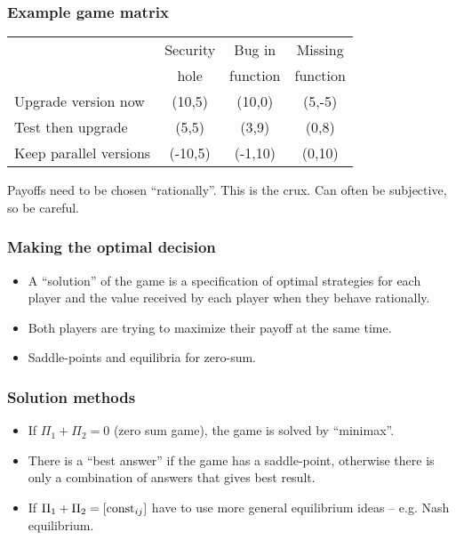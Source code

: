 \documentclass{beamer}
\begin{document}

\begin{frame}\frametitle{Example game matrix}

\begin{center}
\rm
\begin{tabular}{l|c|c|c|}
 & Security & Bug in   & Missing \\
 & hole     & function & function\\
\hline
{\small Upgrade version now} & (10,5) & (10,0) & (5,-5)\\
{\small Test then upgrade}   & (5,5)  & (3,9)  & (0,8)\\
{\small Keep parallel versions}   & (-10,5)& (-1,10) & (0,10)\\
\end{tabular}
\end{center}


Payoffs need to be chosen ``rationally''. This is the crux.
Can often be subjective, so be careful.
\end{frame}



\begin{frame}\frametitle{Making the optimal decision}

\begin{itemize}
\item A ``solution'' of the game is a specification of optimal
strategies for each player and the value received by
each player when they behave rationally.\vspace{0.2cm}

\item Both players are trying to maximize their payoff at the same
time.\vspace{0.2cm}

\item Saddle-points and equilibria for zero-sum.
\end{itemize}
\end{frame}


\begin{frame}
\frametitle{Solution methods}

\begin{itemize}
\item If $\Pi_1+\Pi_2 = 0$ (zero sum game), the game is solved by ``minimax''.\vspace{0.2cm}

\item There is a ``best answer'' if the game has a saddle-point, otherwise there
is only a combination of answers that gives best result.\vspace{0.2cm}

\item If $\Pi_1+\Pi_2 = [{\rm const}_{ij}]$ have to use more general equilibrium
ideas -- e.g. Nash equilibrium.
\end{itemize}
\end{frame}
\end{document}
